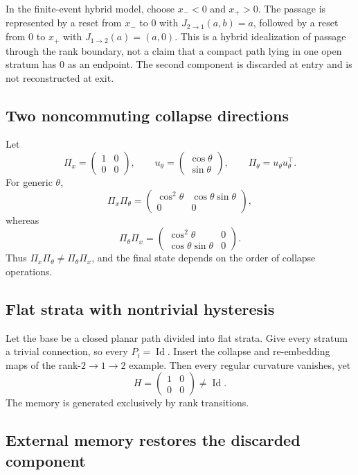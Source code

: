 \documentclass[11pt]{article}
\newcommand{\Id}{\operatorname{Id}}
\begin{document}
In the finite-event hybrid model, choose $x_-<0$ and $x_+>0$. The passage is
represented by a reset from $x_-$ to $0$ with
$J_{2\to1}(a,b)=a$, followed by a reset from $0$ to $x_+$ with
$J_{1\to2}(a)=(a,0)$. This is a hybrid idealization of passage through the
rank boundary, not a claim that a compact path lying in one open stratum has
$0$ as an endpoint. The second component is discarded at entry and is not
reconstructed at exit.

\subsection{Two noncommuting collapse directions}

Let
\[
\Pi_x=\begin{pmatrix}1&0\\0&0\end{pmatrix},
\qquad
u_\theta=\begin{pmatrix}\cos\theta\\\sin\theta\end{pmatrix},
\qquad
\Pi_\theta=u_\theta u_\theta^\top.
\]
For generic $\theta$,
\[
\Pi_x\Pi_\theta
=\begin{pmatrix}
\cos^2\theta&\cos\theta\sin\theta\\
0&0
\end{pmatrix},
\]
whereas
\[
\Pi_\theta\Pi_x
=\begin{pmatrix}
\cos^2\theta&0\\
\cos\theta\sin\theta&0
\end{pmatrix}.
\]
Thus $\Pi_x\Pi_\theta\ne\Pi_\theta\Pi_x$, and the final state depends on the
order of collapse operations.

\subsection{Flat strata with nontrivial hysteresis}

Let the base be a closed planar path divided into flat strata. Give every
stratum a trivial connection, so every $P_i=\Id$. Insert the collapse and
re-embedding maps of the rank-$2\to1\to2$ example. Then every regular curvature
vanishes, yet
\[
H=\begin{pmatrix}1&0\\0&0\end{pmatrix}\ne\Id.
\]
The memory is generated exclusively by rank transitions.

\subsection{External memory restores the discarded component}
\end{document}
